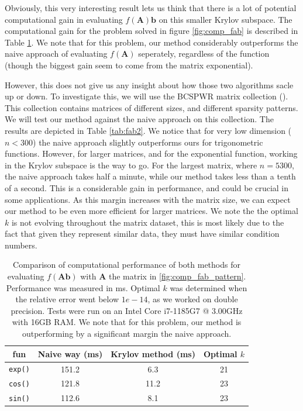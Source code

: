 \documentclass[11pt]{article}
\numberwithin{equation}{section}
\begin{document}
Obviously, this very interesting result lets us think that there is a lot of potential computational gain in evaluating $f(\mathbf{A})\mathbf{b}$ on this smaller Krylov subspace. The computational gain for the problem solved in figure \ref{fig:comp_fab} is described in Table \ref{tab:fab}. We note that for this problem, our method considerably outperforms the naive approach of evaluating $f(\mathbf{A})$ seperately, regardless of the function (though the biggest gain seem to come from the matrix exponential). 

However, this does not give us any insight about how those two algorithms sacle up or down. To investigate this, we will use the BCSPWR matrix collection (\cite{boisvert1997matrix}). This collection contains matrices of different sizes, and different sparsity patterns. We will test our method against the naive approach on this collection. The results are depicted in Table \ref{tab:fab2}. We notice that for very low dimension ($n < 300$) the naive approach slightly outperforms ours for trigonometric functions. However, for larger matrices, and for the exponential function, working in the Krylov subspace is the way to go. For the largest matrix, where $n=5300$, the naive approach takes half a minute, while our method takes less than a tenth of a second. This is a considerable gain in performance, and could be crucial in some applications. As this margin increases with the matrix size, we can expect our method to be even more efficient for larger matrices. We note the the optimal $k$ is not evolving throughout the matrix dataset, this is most likely due to the fact that given they represent similar data, they must have similar condition numbers.

\begin{table}
    \centering
    \caption{Comparison of computational performance of both methods for evaluating $f(\mathbf{A}\mathbf{b})$ with $\mathbf{A}$ the matrix in \ref{fig:comp_fab_pattern}. Performance was measured in ms. Optimal $k$ was determined when the relative error went below $1e-14$, as we worked on double precision. Tests were run on an Intel Core i7-1185G7 @ 3.00GHz with 16GB RAM. We note that for this problem, our method is outperforming by a significant margin the naive approach.}
    \begin{tabular}{|c|c|c|c|}
        \hline
        \textbf{fun} & \textbf{Naive way (ms)} & \textbf{Krylov method (ms)} & \textbf{Optimal $k$} \\\hline
        \texttt{exp()} & 151.2 & 6.3 & 21 \\ \hline
        \texttt{cos()} & 121.8 & 11.2 & 23 \\ \hline
        \texttt{sin()} & 112.6 & 8.1 & 23 \\
        \hline
    \end{tabular}
    \label{tab:fab}
\end{table}
\end{document}
